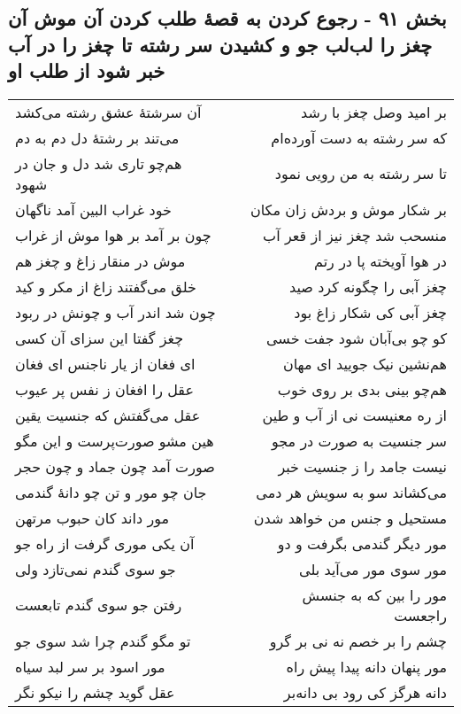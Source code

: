 \begin{center}
\section*{بخش ۹۱ - رجوع کردن به قصهٔ طلب کردن آن موش  آن چغز را لب‌لب جو و کشیدن سر رشته تا چغز را در آب خبر شود از طلب او}
\label{sec:sh091}
\begin{longtable}{l p{0.5cm} r}
آن سرشتهٔ عشق رشته می‌کشد
&&
بر امید وصل چغز با رشد
\\
می‌تند بر رشتهٔ دل دم به دم
&&
که سر رشته به دست آورده‌ام
\\
هم‌چو تاری شد دل و جان در شهود
&&
تا سر رشته به من رویی نمود
\\
خود غراب البین آمد ناگهان
&&
بر شکار موش و بردش زان مکان
\\
چون بر آمد بر هوا موش از غراب
&&
منسحب شد چغز نیز از قعر آب
\\
موش در منقار زاغ و چغز هم
&&
در هوا آویخته پا در رتم
\\
خلق می‌گفتند زاغ از مکر و کید
&&
چغز آبی را چگونه کرد صید
\\
چون شد اندر آب و چونش در ربود
&&
چغز آبی کی شکار زاغ بود
\\
چغز گفتا این سزای آن کسی
&&
کو چو بی‌آبان شود جفت خسی
\\
ای فغان از یار ناجنس ای فغان
&&
هم‌نشین نیک جویید ای مهان
\\
عقل را افغان ز نفس پر عیوب
&&
هم‌چو بینی بدی بر روی خوب
\\
عقل می‌گفتش که جنسیت یقین
&&
از ره معنیست نی از آب و طین
\\
هین مشو صورت‌پرست و این مگو
&&
سر جنسیت به صورت در مجو
\\
صورت آمد چون جماد و چون حجر
&&
نیست جامد را ز جنسیت خبر
\\
جان چو مور و تن چو دانهٔ گندمی
&&
می‌کشاند سو به سویش هر دمی
\\
مور داند کان حبوب مرتهن
&&
مستحیل و جنس من خواهد شدن
\\
آن یکی موری گرفت از راه جو
&&
مور دیگر گندمی بگرفت و دو
\\
جو سوی گندم نمی‌تازد ولی
&&
مور سوی مور می‌آید بلی
\\
رفتن جو سوی گندم تابعست
&&
مور را بین که به جنسش راجعست
\\
تو مگو گندم چرا شد سوی جو
&&
چشم را بر خصم نه نی بر گرو
\\
مور اسود بر سر لبد سیاه
&&
مور پنهان دانه پیدا پیش راه
\\
عقل گوید چشم را نیکو نگر
&&
دانه هرگز کی رود بی دانه‌بر

\end{longtable}
\end{center}
